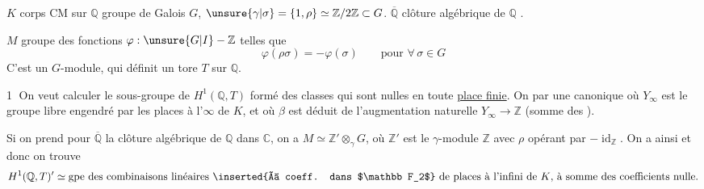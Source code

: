 $K$ corps CM  sur $\mathbb Q$ groupe de Galois $G$,
$\unsure{\gamma|\sigma}=\{1,\rho\}\simeq\mathbb Z/2\mathbb Z\subset G$.
$\overline{\mathbb Q}$  clôture algébrique de $\mathbb Q$
.


$M$ groupe des fonctions \deleted{\unsure{\varphi}} $\varphi:\unsure{G|I}-\mathbb Z$ telles que
\[
\varphi(\rho\sigma)=-\varphi(\sigma)\qquad\text{pour }\forall\,\sigma\in G
\]
C'est un $G$-module, qui définit  un tore $T$ sur $\mathbb Q$.

\textcircled{1} On veut calculer le sous-groupe  de
$H^1(\mathbb Q,T)$ formé des classes qui sont nulles en toute \uline{place finie}.
On  par 
une   canonique
où $Y_\infty$ est le groupe libre engendré par les places à l'$\infty$ de $K$,
et où $\beta$ est déduit de l'augmentation naturelle $Y_\infty\longrightarrow\mathbb Z$
(somme des ).

Si on prend pour $\overline{\mathbb Q}$ la clôture algébrique de $\mathbb Q$ dans $\mathbb C$,
on a $M\simeq\mathbb Z'\otimes_{\gamma}G$, où $\mathbb Z'$ est le $\gamma$-module
$\mathbb Z$ avec $\rho$ opérant par $-\operatorname{id}_{\mathbb Z}$. On a ainsi
et donc on trouve
\[
H^1(\mathbb Q,T)'\simeq\text{gpe des combinaisons linéaires
\inserted{à coeff. dans $\mathbb F_2$} de places à l'infini de $K$, à somme des coefficients nulle.}
\]
